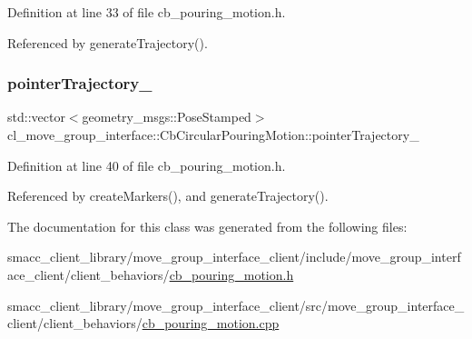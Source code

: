 Definition at line 33 of file cb\+\_\+pouring\+\_\+motion.\+h.



Referenced by generate\+Trajectory().

\mbox{\label{classcl__move__group__interface_1_1CbCircularPouringMotion_a6f53442c47cf9280d8be72ea1c35546f}} 
\subsubsection{\texorpdfstring{pointer\+Trajectory\+\_\+}{pointerTrajectory\_}}
{\footnotesize\ttfamily std\+::vector$<$geometry\+\_\+msgs\+::\+Pose\+Stamped$>$ cl\+\_\+move\+\_\+group\+\_\+interface\+::\+Cb\+Circular\+Pouring\+Motion\+::pointer\+Trajectory\+\_\+\hspace{0.3cm}{\ttfamily [protected]}}



Definition at line 40 of file cb\+\_\+pouring\+\_\+motion.\+h.



Referenced by create\+Markers(), and generate\+Trajectory().



The documentation for this class was generated from the following files\+:\begin{DoxyCompactItemize}
\item 
smacc\+\_\+client\+\_\+library/move\+\_\+group\+\_\+interface\+\_\+client/include/move\+\_\+group\+\_\+interface\+\_\+client/client\+\_\+behaviors/\hyperlink{cb__pouring__motion_8h}{cb\+\_\+pouring\+\_\+motion.\+h}\item 
smacc\+\_\+client\+\_\+library/move\+\_\+group\+\_\+interface\+\_\+client/src/move\+\_\+group\+\_\+interface\+\_\+client/client\+\_\+behaviors/\hyperlink{cb__pouring__motion_8cpp}{cb\+\_\+pouring\+\_\+motion.\+cpp}\end{DoxyCompactItemize}
